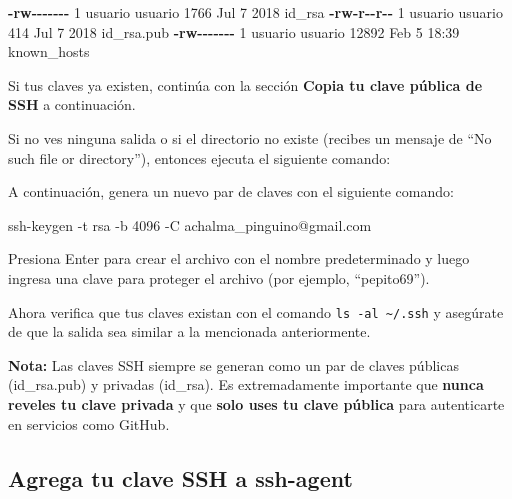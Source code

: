 \documentclass[
  letterpaper,
  DIV=11,
  numbers=noendperiod]{scrartcl}
\newenvironment{Shaded}{}{}
\newcommand{\AttributeTok}[1]{\textcolor[rgb]{0.84,0.23,0.29}{#1}}
\newcommand{\ExtensionTok}[1]{\textcolor[rgb]{0.84,0.23,0.29}{\textbf{#1}}}
\newcommand{\FunctionTok}[1]{\textcolor[rgb]{0.44,0.26,0.76}{#1}}
\newcommand{\NormalTok}[1]{\textcolor[rgb]{0.14,0.16,0.18}{#1}}
\newcommand{\VariableTok}[1]{\textcolor[rgb]{0.89,0.38,0.04}{#1}}
\begin{document}
\begin{Shaded}
\begin{Highlighting}[]
\ExtensionTok{{-}rw{-}{-}{-}{-}{-}{-}{-}}\NormalTok{  1 usuario usuario  1766 Jul  7  2018 id\_rsa}
\ExtensionTok{{-}rw{-}r{-}{-}r{-}{-}}\NormalTok{  1 usuario usuario   414 Jul  7  2018 id\_rsa.pub}
\ExtensionTok{{-}rw{-}{-}{-}{-}{-}{-}{-}}\NormalTok{  1 usuario usuario 12892 Feb  5 18:39 known\_hosts}
\end{Highlighting}
\end{Shaded}

Si tus claves ya existen, continúa con la sección \textbf{Copia tu clave
pública de SSH} a continuación.

Si no ves ninguna salida o si el directorio no existe (recibes un
mensaje de ``No such file or directory''), entonces ejecuta el siguiente
comando:

\begin{Shaded}
\end{Shaded}

A continuación, genera un nuevo par de claves con el siguiente comando:

\begin{Shaded}
\begin{Highlighting}[]
\FunctionTok{ssh{-}keygen} \AttributeTok{{-}t}\NormalTok{ rsa }\AttributeTok{{-}b}\NormalTok{ 4096 }\AttributeTok{{-}C}\NormalTok{ achalma\_pinguino@gmail.com}
\end{Highlighting}
\end{Shaded}

Presiona Enter para crear el archivo con el nombre predeterminado y
luego ingresa una clave para proteger el archivo (por ejemplo,
``pepito69'').

Ahora verifica que tus claves existan con el comando
\texttt{ls\ -al\ \textasciitilde{}/.ssh} y asegúrate de que la salida
sea similar a la mencionada anteriormente.

\textbf{Nota:} Las claves SSH siempre se generan como un par de claves
públicas (id\_rsa.pub) y privadas (id\_rsa). Es extremadamente
importante que \textbf{nunca reveles tu clave privada} y que
\textbf{solo uses tu clave pública} para autenticarte en servicios como
GitHub.

\hypertarget{agrega-tu-clave-ssh-a-ssh-agent}{%
\subsection{Agrega tu clave SSH a
ssh-agent}\label{agrega-tu-clave-ssh-a-ssh-agent}}
\end{document}
